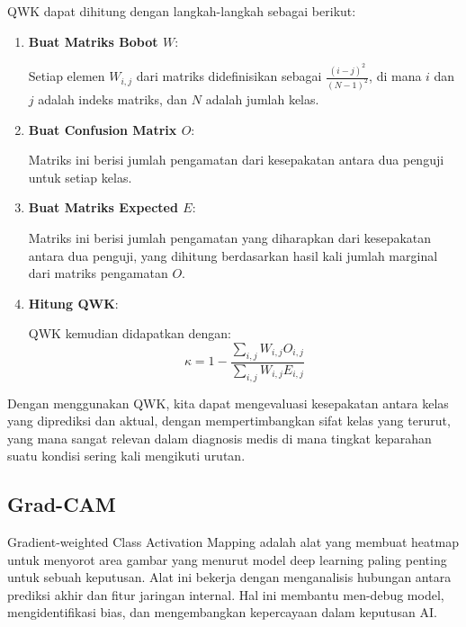 QWK dapat dihitung dengan langkah-langkah sebagai berikut:

\begin{enumerate}
    \item \textbf{Buat Matriks Bobot \(W\)}:
    
    Setiap elemen \(W_{i,j}\) dari matriks didefinisikan sebagai \(\frac{(i - j)^2}{(N - 1)^2}\), di mana \(i\) dan \(j\) adalah indeks matriks, dan \(N\) adalah jumlah kelas.
    
    \item \textbf{Buat Confusion Matrix \(O\)}:
    
    Matriks ini berisi jumlah pengamatan dari kesepakatan antara dua penguji untuk setiap kelas.
    
    \item \textbf{Buat Matriks Expected \(E\)}:
     
    Matriks ini berisi jumlah pengamatan yang diharapkan dari kesepakatan antara dua penguji, yang dihitung berdasarkan hasil kali jumlah marginal dari matriks pengamatan \(O\).
    
    \item \textbf{Hitung QWK}:
    
    QWK kemudian didapatkan dengan:
    \[
    \kappa = 1 - \frac{\sum_{i,j} W_{i,j} O_{i,j}}{\sum_{i,j} W_{i,j} E_{i,j}}
    \]
\end{enumerate}

Dengan menggunakan QWK, kita dapat mengevaluasi kesepakatan antara kelas yang diprediksi dan aktual, dengan mempertimbangkan sifat kelas yang terurut, yang mana sangat relevan dalam diagnosis medis di mana tingkat keparahan suatu kondisi sering kali mengikuti urutan.

\subsection{Grad-CAM}
\label{sec:225}

Gradient-weighted Class Activation Mapping adalah alat yang membuat heatmap untuk menyorot area gambar yang menurut model deep learning paling penting untuk sebuah keputusan. Alat ini bekerja dengan menganalisis hubungan antara prediksi akhir dan fitur jaringan internal. Hal ini membantu men-debug model, mengidentifikasi bias, dan mengembangkan kepercayaan dalam keputusan AI.